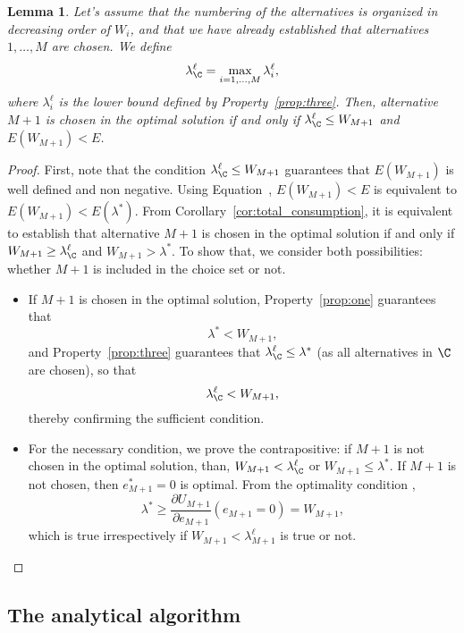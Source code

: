 \documentclass[12pt,a4paper]{article}
\newtheorem{lemma}{Lemma}
\begin{document}
\begin{lemma}
    \label{lemma:next_alt}
    Let's assume that the numbering of the alternatives is organized in decreasing order of $W_i$,
and that we have already established that alternatives $1,\ldots, M$ are chosen. We define
    \[
        \lambda^{\ell}_{\C} = \max_{i=1, \ldots, M}\lambda^\ell_i,
    \]
    where $\lambda^\ell_i$ is the lower bound defined by Property~\ref{prop:three}.
    Then, alternative $M+1$ is chosen in the optimal solution if and only if $\lambda^\ell_{\C} \leq W_{M+1}$ and $E(W_{M+1})< E$.
\end{lemma}
\begin{proof}
    First, note that the condition $\lambda^\ell_{\C} \leq W_{M+1}$ guarantees that $E(W_{M+1})$ is well defined and non negative.
    Using  Equation~, $E(W_{M+1})< E$ is equivalent to $E(W_{M+1})< E(\lambda^*)$. From Corollary~\ref{cor:total_consumption},
    it is equivalent to establish that alternative $M+1$ is chosen in the optimal solution if and only if
    $W_{M+1} \geq \lambda^\ell_{\C}$ and $W_{M+1} > \lambda^*$.
    To show that, we consider both possibilities: whether $M+1$ is included in the choice set or not.
    \begin{itemize}
        \item If $M+1$ is chosen in the optimal solution, Property~\ref{prop:one} guarantees that
         \[
        \lambda^* < W_{M+1},
         \]
        and Property~\ref{prop:three} guarantees that $\lambda^\ell_{\C} \leq \lambda^*$ (as all alternatives in $\C$ are chosen), so that
        \[
        \lambda^\ell_{\C} < W_{M+1},
         \]
         thereby confirming the sufficient condition.
        \item For the necessary condition, we prove the contrapositive: if  $M+1$ is not chosen in the optimal solution, than,
        $W_{M+1} < \lambda^\ell_\C$ or $W_{M+1} \leq \lambda^*$.
        If $M+1$ is not chosen, then $e^*_{M+1}=0$ is optimal. From the optimality condition ,
    \[
        \lambda^* \geq \frac{\partial U_{M+1}}{\partial e_{M+1}}(e_{M+1}=0) = W_{M+1},
    \]
        which is true irrespectively if $W_{M+1} < \lambda^\ell_{M+1}$ is true or not.
    \end{itemize}
\end{proof}


\subsection{The analytical algorithm}
\end{document}
